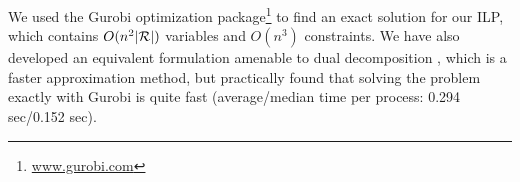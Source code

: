 We used the Gurobi optimization package\footnote{\url{www.gurobi.com}} to find an exact solution for our ILP, which contains $O(n^2|\mathcal{R}|)$ variables and $O(n^3)$ constraints. We have also developed an equivalent formulation amenable to dual decomposition \cite{Reichart12}, which is a faster approximation method, but practically found that solving the problem exactly with Gurobi is quite fast (average/median time per process: 0.294 sec/0.152 sec).



